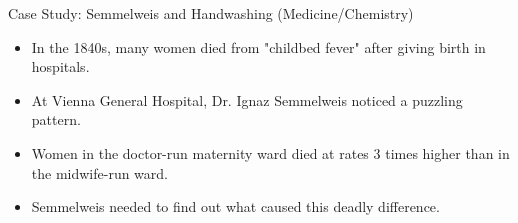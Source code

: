 \documentclass{beamer}
\begin{document}
\begin{frame}{Case Study: Semmelweis and Handwashing (Medicine/Chemistry)}
    \begin{itemize}
        \item In the 1840s, many women died from "childbed fever" after giving birth in hospitals.
        \item At Vienna General Hospital, Dr. Ignaz Semmelweis noticed a puzzling pattern.
        \item Women in the doctor-run maternity ward died at rates 3 times higher than in the midwife-run ward.
        \item Semmelweis needed to find out what caused this deadly difference.
    \end{itemize}
    
    \begin{center}
    \end{center}
\end{frame}
\end{document}
